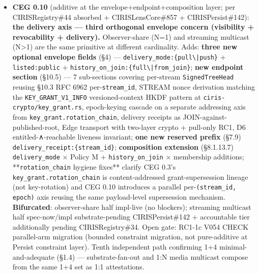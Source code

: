 \documentclass[10pt]{article}
\begin{document}
\begin{itemize}
\item \textbf{CEG 0.10} (additive at the envelope+endpoint+composition layer; per CIRISRegistry\#44 absorbed + CIRISLensCore\#857 + CIRISPersist\#142): \textbf{the delivery axis — third orthogonal envelope concern (visibility + revocability + delivery).} Observer-share (N=1) and streaming multicast (N>1) are the same primitive at different cardinality. Adds: \textbf{three new optional envelope fields} (§4) — \texttt{delivery\_mode:\{pull\textbackslash{}|push\}} + \texttt{listed:public} + \texttt{history\_on\_join:\{full\textbackslash{}|from\_join\}}; \textbf{new endpoint section} (§10.5) — 7 sub-sections covering per-stream \texttt{SignedTreeHead} reusing §10.3 RFC 6962 per-\texttt{stream\_id}, STREAM nonce derivation matching the \texttt{KEY\_GRANT\_V1\_INFO} versioned-context HKDF pattern at \texttt{ciris-crypto/key\_grant.rs}, epoch-keying cascade on a separate addressing axis from \texttt{key\_grant.rotation\_chain}, delivery receipts as JOIN-against-published-root, Edge transport with two-layer crypto + pull-only RC1, D6 entitled-∧-reachable liveness invariant; \textbf{one new reserved prefix} (§7.9) \texttt{delivery\_receipt:\{stream\_id\}}; \textbf{composition extension} (§8.1.13.7) \texttt{delivery\_mode} × Policy M + \texttt{history\_on\_join} × membership additions; **\texttt{rotation\_chain} hygiene fixes** clarify CEG 0.3's \texttt{key\_grant.rotation\_chain} is content-addressed grant-supersession lineage (not key-rotation) and CEG 0.10 introduces a parallel per-\texttt{(stream\_id, epoch)} axis reusing the same payload-level supersession mechanism. \textbf{Bifurcated}: observer-share half impl-live (no blockers); streaming multicast half spec-now/impl substrate-pending CIRISPersist\#142 + accountable tier additionally pending CIRISRegistry\#34. Open gate: RC1-1c V054 CHECK parallel-arm migration (bounded constraint migration, not pure-additive at Persist constraint layer). Tenth independent path confirming 1+4 minimal-and-adequate (§1.4) — substrate-fan-out and 1:N media multicast compose from the same 1+4 set as 1:1 attestations.

\end{itemize}
\end{document}

